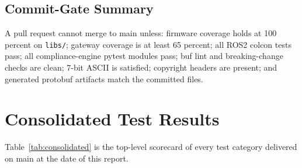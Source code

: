 \documentclass[11pt,letterpaper]{article}
\begin{document}
\subsection{Commit-Gate Summary}
A pull request cannot merge to main unless: firmware coverage holds
at 100 percent on \texttt{libs/}; gateway coverage is at least 65
percent; all ROS2 colcon tests pass; all compliance-engine pytest
modules pass; buf lint and breaking-change checks are clean; 7-bit
ASCII is satisfied; copyright headers are present; and generated
protobuf artifacts match the committed files.

\section{Consolidated Test Results}
\label{sec:results}

Table~\ref{tab:consolidated} is the top-level scorecard of every
test category delivered on main at the date of this report.
\end{document}
